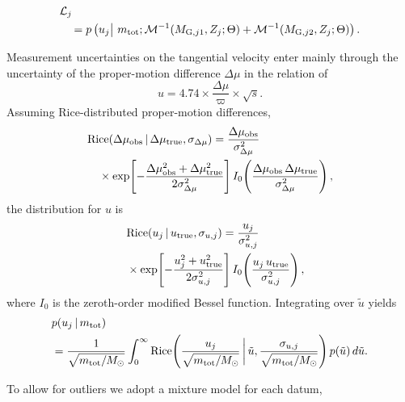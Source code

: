 \begin{align}
    &\mathcal{L}_j \\
    &\quad = p \left(u_j \big|\ m_{\rm tot};\mathcal{M}^{-1}(M_{{\rm G},j1}, Z_j;\Theta) + \mathcal{M}^{-1}(M_{{\rm G},j2},Z_j;\Theta) \right). \notag
\end{align}

Measurement uncertainties on the tangential velocity enter mainly through the uncertainty of the proper-motion difference $\Delta\mu$ in the relation of 
\begin{equation}
    u = 4.74 \times \frac{\Delta\mu}{\varpi} \times \sqrt{s}.
\end{equation}
Assuming Rice-distributed proper-motion differences,
\begin{align}
    &\mathrm{Rice}(\Delta\mu_{\rm obs}\,|\,\Delta\mu_{\rm true},\sigma_{\Delta\mu}) = \frac{\Delta\mu_{\rm obs}}{\sigma_{\Delta\mu}^2} \notag\\
    &\quad \times \exp\!\left[-\frac{\Delta\mu_{\rm obs}^2 + \Delta\mu_{\rm true}^2}{2\sigma_{\Delta\mu}^2}\right] I_0\!\left(\frac{\Delta\mu_{\rm obs}\,\Delta\mu_{\rm true}}{\sigma_{\Delta\mu}^2}\right),
\end{align}
the distribution for $u$ is
\begin{align}
    &\mathrm{Rice}(u_j\,|\,u_{\rm true},\sigma_{u,j}) = \frac{u_j}{\sigma_{u,j}^2}  \notag\\
    \quad &\times \exp\!\left[-\frac{u_j^2 + u_{\rm true}^2}{2\sigma_{u,j}^2}\right] I_0\!\left(\frac{u_j\,u_{\rm true}}{\sigma_{u,j}^2}\right),
\end{align}
where $I_0$ is the zeroth-order modified Bessel function. Integrating over $\tilde{u}$ yields
\begin{align}
    &p(u_j\,|\,m_{\rm tot}) \\
    &= \frac{1}{\sqrt{m_{\rm tot}/M_{\odot}}} \int_0^\infty \mathrm{Rice}\!\left(\frac{u_j}{\sqrt{m_{\rm tot}/M_{\odot}}} \,\bigg|\, \tilde{u}, \frac{\sigma_{u,j}}{\sqrt{m_{\rm tot}/M_{\odot}}}\right) p(\tilde{u})\, d\tilde{u}. \notag
\end{align}

To allow for outliers we adopt a mixture model for each datum,

